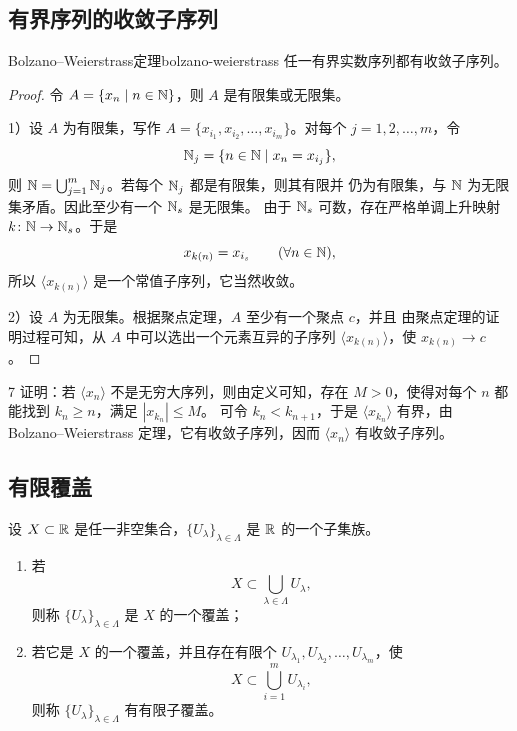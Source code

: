 \subsection{有界序列的收敛子序列}
	\label{sec:3-4-6}

\begin{mythm}{Bolzano--Weierstrass定理}{bolzano-weierstrass}
任一有界实数序列都有收敛子序列。
\end{mythm}

\begin{proof}
令 \(A=\{x_n\mid n\in\mathbb{N}\}\)，则 \(A\) 是有限集或无限集。

1）设 \(A\) 为有限集，写作
\(A=\{x_{i_1},x_{i_2},\ldots,x_{i_m}\}\)。对每个
\(j=1,2,\ldots,m\)，令
\[
\mathbb{N}_j=\{n\in\mathbb{N}\mid x_n=x_{i_j}\},
\]
则 \(\mathbb{N}=\bigcup_{j=1}^m\mathbb{N}_j\)。若每个 \(\mathbb{N}_j\) 都是有限集，则其有限并
仍为有限集，与 \(\mathbb{N}\) 为无限集矛盾。因此至少有一个 \(\mathbb{N}_s\) 是无限集。
由于 \(\mathbb{N}_s\) 可数，存在严格单调上升映射
\(k\colon\mathbb{N}\to\mathbb{N}_s\)。于是
\[
x_{k(n)}=x_{i_s}\qquad(\forall n\in\mathbb{N}),
\]
所以 \(\langle x_{k(n)}\rangle\) 是一个常值子序列，它当然收敛。

2）设 \(A\) 为无限集。根据聚点定理，\(A\) 至少有一个聚点 \(c\)，并且
由聚点定理的证明过程可知，从 \(A\) 中可以选出一个元素互异的子序列
\(\langle x_{k(n)}\rangle\)，使 \(x_{k(n)}\to c\)。
\end{proof}

\begin{sourceexample}{7}
证明：若 \(\langle x_n\rangle\) 不是无穷大序列，则由定义可知，存在
\(M>0\)，使得对每个 \(n\) 都能找到 \(k_n\geqslant n\)，满足
\(|x_{k_n}|\leqslant M\)。
可令 \(k_n<k_{n+1}\)，于是 \(\langle x_{k_n}\rangle\) 有界，由
Bolzano--Weierstrass 定理，它有收敛子序列，因而
\(\langle x_n\rangle\) 有收敛子序列。
\end{sourceexample}

\subsection{有限覆盖}
	\label{sec:3-4-7}

\begin{mydef*}{}
设 \(X\subset\mathbb{R}\) 是任一非空集合，\(\{U_\lambda\}_{\lambda\in\Lambda}\)
是 \(\mathbb{R}\) 的一个子集族。
\begin{enumerate}[label=\arabic*)]
\item 若
\[
X\subset\bigcup_{\lambda\in\Lambda}U_\lambda,
\]
则称 \(\{U_\lambda\}_{\lambda\in\Lambda}\) 是 \(X\) 的一个覆盖；
\item 若它是 \(X\) 的一个覆盖，并且存在有限个
\(U_{\lambda_1},U_{\lambda_2},\ldots,U_{\lambda_m}\)，使
\[
X\subset\bigcup_{i=1}^mU_{\lambda_i},
\]
则称 \(\{U_\lambda\}_{\lambda\in\Lambda}\) 有有限子覆盖。
\end{enumerate}
\end{mydef*}

